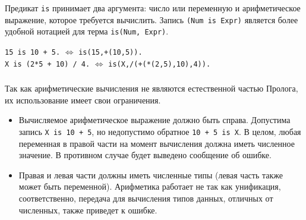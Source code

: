 \begin{frame}

	\frametitle{\insertsection}
	\framesubtitle{\insertsubsection}	
	
	Предикат \texttt{is} принимает два аргумента: число или переменную и арифметическое выражение, которое требуется вычислить.
	Запись \texttt{(Num is Expr)} является более удобной нотацией для терма \texttt{is(Num, Expr)}.
	
	\begin{rexample}
		\texttt{15 is 10 + 5.} \(\Leftrightarrow \) \texttt{is(15,+(10,5)).} \\
		\texttt{X is (2*5 + 10) / 4.} \(\Leftrightarrow \) \texttt{is(X,/(+(*(2,5),10),4)).}
	\end{rexample}

\end{frame}


\begin{frame}
	
	\frametitle{\insertsection}
	\framesubtitle{\insertsubsection}
	
	Так как арифметические вычисления не являются естественной частью Пролога, их использование имеет свои ограничения.
	
	\begin{itemize}
		\item Вычисляемое арифметическое выражение должно быть справа. Допустима запись \texttt{X is 10 + 5}, но недопустимо обратное \texttt{10 + 5 is X}.
		В целом, любая переменная в правой части на момент вычисления должна иметь численное значение. В противном случае будет выведено сообщение об ошибке.
		\item Правая и левая части должны иметь численные типы (левая часть также может быть переменной). Арифметика работает не так как унификация,
		соответственно, передача для вычисления типов данных, отличных от численных, также приведет к ошибке.
	\end{itemize}
	
	
\end{frame}



